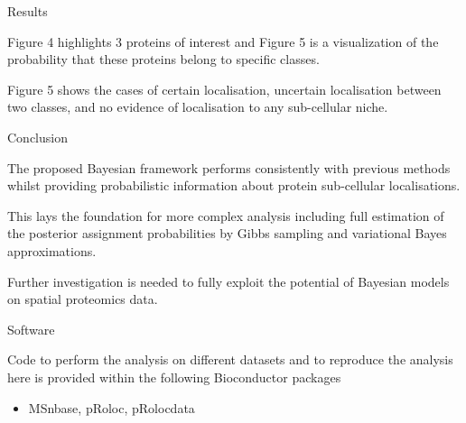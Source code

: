 \documentclass[final, 10pt]{beamer}
\newlength{\onecolwid}
\begin{document}
\begin{frame}[t]
\begin{columns}[t]
\begin{column}{\onecolwid}

  \begin{block}{Results}

         \begin{itemize}
         \small{\item Figure 4 highlights 3 proteins of interest and Figure 5 is a visualization of the probability that these proteins belong to specific classes. 
         \item Figure 5 shows the cases of certain localisation, uncertain localisation between two classes, and no evidence of localisation to any sub-cellular niche.}
         \end{itemize}

  \end{block}
  
          \begin{block}{Conclusion}
          \begin{itemize}
          \small{\item  The proposed Bayesian framework performs consistently with previous methods whilst providing probabilistic information about protein sub-cellular localisations.
          \item This lays the foundation for more complex analysis including full estimation of the posterior assignment probabilities by Gibbs sampling and variational Bayes approximations.
          \item Further investigation is needed to fully exploit the potential of Bayesian models on spatial proteomics data.}
          \end{itemize}
          \end{block}   
          
          
  \begin{block}{Software}
          
              \small{Code to perform the analysis on different datasets and to reproduce the analysis here is provided within the following Bioconductor packages
              \begin{itemize}
              \item MSnbase, pRoloc, pRolocdata
              \end{itemize}
          	}
            \end{block}
          

\end{column}
\end{columns}
\end{frame}
\end{document}
